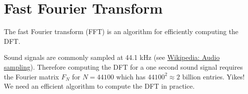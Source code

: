 \section{Fast Fourier Transform}

\begin{bigidea}
The fast Fourier transform (FFT) is an algorithm for efficiently computing the DFT.
\end{bigidea}

\begin{note}
Sound signals are commonly sampled at 44.1 kHz (see \href{https://en.wikipedia.org/wiki/Sampling_(signal_processing)#Audio_sampling}{Wikipedia: Audio sampling}). Therefore computing the DFT for a one second sound signal requires the Fourier matrix $F_N$ for $N=44100$ which has $44100^2 \approx 2\text{ billion}$ entries. Yikes! We need an efficient algorithm to compute the DFT in practice.
\end{note}

